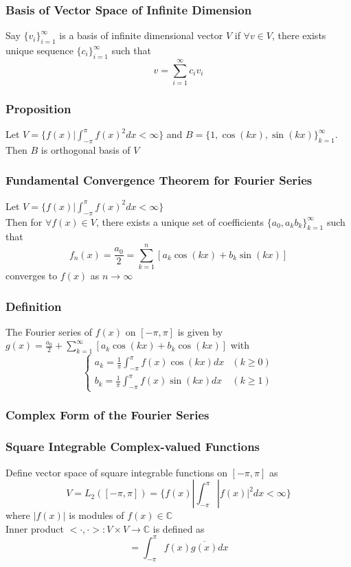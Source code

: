 \documentclass[11pt]{article}
\newcommand{\C}{{\mathbb{C}}}
\begin{document}
\subsubsection*{Basis of Vector Space of Infinite Dimension}
Say $\{v_i\}_{i=1}^\infty$ is a basis of infinite dimensional vector $V$ if $\forall v\in V$, there exists unique sequence 
$\{c_i\}_{i=1}^\infty$ such that 
\[v=\sum_{i=1}^{\infty}c_iv_i\]
\subsubsection*{Proposition}
Let $V=\{f(x)|\int_{-\pi}^{\pi}f(x)^2dx<\infty\}$
and $B = \{1,\cos(kx),\sin(kx)\}_{k=1}^\infty$. Then $B$ is orthogonal basis of $V$
\subsubsection*{Fundamental Convergence Theorem for Fourier Series}
Let $V=\{f(x)|\int_{-\pi}^{\pi}f(x)^2dx<\infty\}$ \\
Then for $\forall f(x)\in V$, there exists a unique set of coefficients $\{a_0,a_kb_k\}_{k=1}^\infty$ such that
\[f_n(x) = \frac{a_0}{2} = \sum_{k=1}^{n}[a_k\cos(kx) + b_k\sin(kx)]\]
converges to $f(x)$ as $n\rightarrow\infty$
\subsubsection*{Definition}
The Fourier series of $f(x)$ on $[-\pi, \pi]$ is given by $g(x) = \frac{a_0}{2}+\sum_{k=1}^{\infty}[a_k\cos(kx) + b_k\cos(kx)]$ with 
\[\begin{cases}
  a_k = \frac{1}{\pi}\int_{-\pi}^{\pi}f(x)\cos(kx)dx &(k\geq0)\\
  b_k = \frac{1}{\pi}\int_{-\pi}^{\pi}f(x)\sin(kx)dx &(k\geq1)
\end{cases}\]
\subsubsection{Complex Form of the Fourier Series}
\subsubsection*{Square Integrable Complex-valued Functions}
Define vector space of square integrable functions on $[-\pi,\pi]$ as \[V = L_2([-\pi,\pi]) = \{f(x)|\int_{-\pi}^{\pi}|f(x)|^2dx<\infty\}\]
where $|f(x)|$ is modules of $f(x)\in\C$\\
Inner product $<\cdot,\cdot>: V\times V\rightarrow\C$ is defined as 
\[<f,g> = \int_{-\pi}^{\pi}f(x)\overline{g(x)}dx\]
\end{document}
